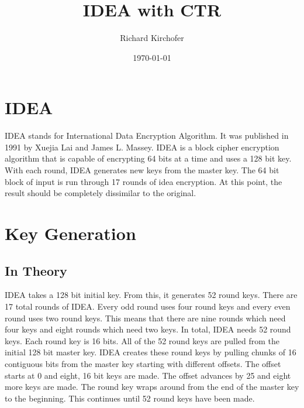 \documentclass[12pt]{article}
\title{IDEA with CTR}
\author{Richard Kirchofer}
\date{\today}
\begin{document}
\maketitle
\section{IDEA}
IDEA stands for International Data Encryption Algorithm. It was published in 1991 by Xuejia Lai and James L. Massey. IDEA is a block cipher encryption algorithm that is capable of encrypting 64 bits at a time and uses a 128 bit key. With each round, IDEA generates new keys from the master key. The 64 bit block of input is run through 17 rounds of idea encryption. At this point, the result should be completely dissimilar to the original. 

\section{Key Generation}
\subsection{In Theory}
IDEA takes a 128 bit initial key. From this, it generates 52 round keys. There are 17 total rounds of IDEA. Every odd round uses four round keys and every even round uses two round keys. This means that there are nine rounds which need four keys and eight rounds which need two keys. In total, IDEA needs 52 round keys.
Each round key is 16 bits. All of the 52 round keys are pulled from the initial 128 bit master key. IDEA creates these round keys by pulling chunks of 16 contiguous bits from the master key starting with different offsets. The offset starts at 0 and eight, 16 bit keys are made. The offset advances by 25 and eight more keys are made. The round key wraps around from the end of the master key to the beginning. This continues until 52 round keys have been made.
\end{document}
